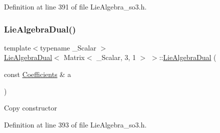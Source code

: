Definition at line 391 of file Lie\+Algebra\+\_\+so3.\+h.

\hypertarget{class_lie_algebra_dual_3_01_matrix_3_01___scalar_00_013_00_011_01_4_01_4_ae77a75bc1bef31fa4498c3e4b3888707}{}\label{class_lie_algebra_dual_3_01_matrix_3_01___scalar_00_013_00_011_01_4_01_4_ae77a75bc1bef31fa4498c3e4b3888707} 
\subsubsection{\texorpdfstring{Lie\+Algebra\+Dual()}{LieAlgebraDual()}\hspace{0.1cm}{\footnotesize\ttfamily [3/4]}}
{\footnotesize\ttfamily template$<$typename \+\_\+\+Scalar $>$ \\
\hyperlink{class_lie_algebra_dual}{Lie\+Algebra\+Dual}$<$ Matrix$<$ \+\_\+\+Scalar, 3, 1 $>$ $>$\+::\hyperlink{class_lie_algebra_dual}{Lie\+Algebra\+Dual} (\begin{DoxyParamCaption}\item[{const \hyperlink{class_lie_algebra_dual_3_01_matrix_3_01___scalar_00_013_00_011_01_4_01_4_ae90a3999d66fafefffe5538cd72985ee}{Coefficients} \&}]{a }\end{DoxyParamCaption})\hspace{0.3cm}{\ttfamily [inline]}}

Copy constructor 

Definition at line 393 of file Lie\+Algebra\+\_\+so3.\+h.

\hypertarget{class_lie_algebra_dual_3_01_matrix_3_01___scalar_00_013_00_011_01_4_01_4_a6d74b87931ff21cb2a83d32d11a91f27}{}\label{class_lie_algebra_dual_3_01_matrix_3_01___scalar_00_013_00_011_01_4_01_4_a6d74b87931ff21cb2a83d32d11a91f27} 
